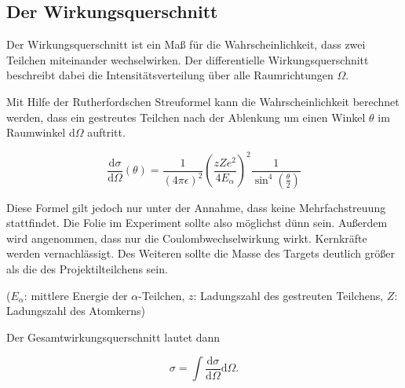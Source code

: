 \subsection{Der Wirkungsquerschnitt}

Der Wirkungsquerschnitt ist ein Maß für die Wahrscheinlichkeit, dass zwei Teilchen miteinander wechselwirken. Der differentielle
Wirkungsquerschnitt beschreibt dabei die Intensitätsverteilung über alle Raumrichtungen $\Omega$.

Mit Hilfe der Rutherfordschen Streuformel kann die Wahrscheinlichkeit berechnet werden, dass ein gestreutes Teilchen nach der
Ablenkung um einen Winkel $\theta$ im Raumwinkel d$\Omega$ auftritt.

\begin{equation}
\frac{\mathrm{d}\sigma}{\mathrm{d}\Omega}(\theta)=\frac{1}{(4\pi\epsilon)^2}\left(\frac{z Z e^2}{4 E_{\alpha}}\right)^2\frac{1}{\sin^4{\left(\frac{\theta}{2}\right)}}
\label{eqn:dsdo}
\end{equation}

Diese Formel gilt jedoch nur unter der Annahme, dass keine Mehrfachstreuung stattfindet. Die Folie im Experiment sollte
also möglichst dünn sein. Außerdem wird angenommen, dass nur die Coulombwechselwirkung wirkt. Kernkräfte werden vernachlässigt.
Des Weiteren sollte die Masse des Targets deutlich größer als die des Projektilteilchens sein.

($E_{\alpha}$: mittlere Energie der $\alpha$-Teilchen, $z$: Ladungszahl des gestreuten Teilchens, $Z$: Ladungszahl des Atomkerns)

Der Gesamtwirkungsquerschnitt lautet dann

\begin{equation}
  \sigma = \int \frac{\mathrm{d}\sigma}{\mathrm{d}\Omega}\mathrm{d}\Omega .
\end{equation}
